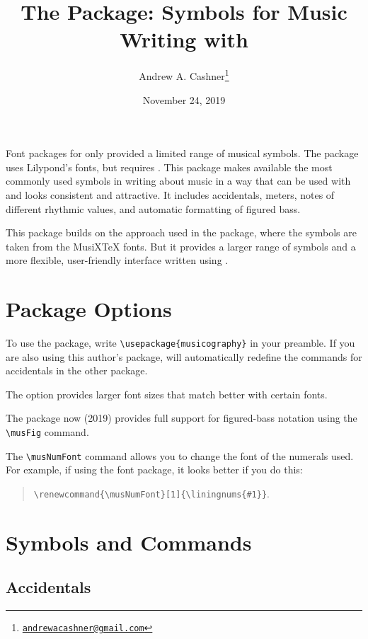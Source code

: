 \documentclass{article}
\title{The \code{musicography} Package: Symbols for Music Writing with
\code{pdflatex}}
\author{Andrew A. Cashner\thanks{%
    \href{mailto:andrewacashner@gmail.com}
    {\nolinkurl{andrewacashner@gmail.com}}%
    }%
}
\date{November 24, 2019}
\begin{document}
\maketitle

Font packages for  only provided a limited range of musical
symbols. 
The  package uses Lilypond's fonts, but requires
. 
This package makes available the most commonly used symbols in writing about
music in a way that can be used with  and looks consistent and
attractive.
It includes accidentals, meters, notes of different rhythmic values, and
automatic formatting of figured bass.

This package builds on the approach used in the  package, where
the symbols are taken from the MusiXTeX fonts.
But it provides a larger range of symbols and a more flexible, user-friendly
interface written using .

\tableofcontents

\section{Package Options}

To use the package, write \verb|\usepackage{musicography}| in your preamble.
If you are also using this author's  package, 
 will automatically redefine the commands for accidentals in
the other package.

The  option provides larger font sizes that match better with
certain fonts.

The package now (2019) provides full support for figured-bass notation using the
\verb|\musFig| command.

The \verb|\musNumFont| command allows you to change the font of the numerals
used.
For example, if using the  font package, it looks better if you
do this: 
\begin{quote}
    \verb|\renewcommand{\musNumFont}[1]{\liningnums{#1}}|.
\end{quote}


\section{Symbols and Commands}

\subsection{Accidentals}
\end{document}
